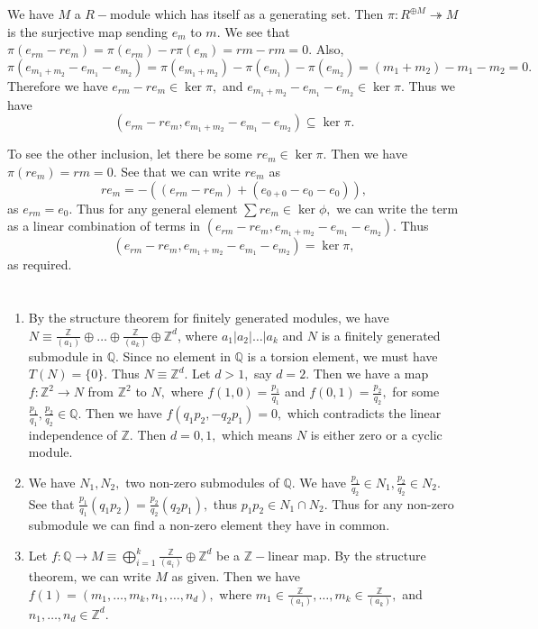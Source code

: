 \documentclass{article}
\begin{document}
\section{} %

\section{} %
We have $M$ a $R-$module which has itself as a generating set. Then $\pi: R^{\oplus M}\twoheadrightarrow M$ is the surjective map sending $e_m$ to $m.$ We 
see that $\pi(e_{rm}-re_m)=\pi(e_{rm})-r\pi(e_m)=rm-rm=0.$ Also, $\pi(e_{m_1+m_2}-e_{m_1}-e_{m_2})=\pi(e_{m_1+m_2})-\pi(e_{m_1})-\pi(e_{m_2})= 
(m_1+m_2)-m_1-m_2=0.$ Therefore we have $ e_{rm}-re_m \in \ker \pi, $ and $e_{m_1+m_2}-e_{m_1}-e_{m_2} \in \ker \pi.$ Thus we have 
$$(e_{rm}-re_m,e_{m_1+m_2}-e_{m_1}-e_{m_2}) \subseteq \ker \pi.$$ 

To see the other inclusion, let there be some $re_m \in \ker \pi.$ Then we have $\pi(re_m)=rm=0.$ See that we can write $re_m$ as $$re_m=-( 
(e_{rm}-re_m)+(e_{0+0}-e_0-e_0) ),$$ as $e_{rm}=e_0.$ Thus for any general element $\sum re_m \in \ker \phi ,$ we can write the term as a linear combination 
of terms in $\left(e_{rm}-re_m, e_{m_1+m_2}-e_{m_1}-e_{m_2}\right).$ Thus $$(e_{rm}-re_m,e_{m_1+m_2}-e_{m_1}-e_{m_2})= \ker \pi, $$ as required. 
\section{} %
\begin{enumerate}
	\item By the structure theorem for finitely generated modules, we have $N \equiv \frac{\mathbb{Z}}{(a_1)}\oplus \dots \oplus 
	\frac{\mathbb{Z}}{(a_k)}\oplus \mathbb{Z}^d$, where $a_1|a_2|\dots|a_k$ and $N$ is a finitely generated submodule in $\mathbb{Q}.$ Since no element in 
	$\mathbb{Q}$ is a torsion element, we must have $T(N)=\{0\}.$ Thus $N \equiv \mathbb{Z}^d.$ Let $d >1,$ say $d=2.$ Then we have a map $f: \mathbb{Z}^2 
	\rightarrow N$ from $\mathbb{Z}^2$ to $N,$ where $f(1,0)=\frac{p_1}{q_1}$ and $f(0,1)=\frac{p_2}{q_2},$ for some $\frac{p_1}{q_1},\frac{p_2}{q_2} \in 
	\mathbb{Q}.$ Then we have $ f(q_1p_2,-q_2p_1)=0, $ which contradicts the linear independence of $\mathbb{Z}.$ Then $d=0,1,$ which means $N$ is either 
	zero or a cyclic module.
	
	\item We have $N_1,N_2,$ two non-zero submodules of $\mathbb{Q}.$ We have $\frac{p_1}{q_2} \in N_1, \frac{p_2}{q_2} \in N_2.$ See that $ 
	\frac{p_1}{q_1}(q_1p_2)=\frac{p_2}{q_2}(q_2p_1),$ thus $p_1p_2 \in N_1 \cap N_2.$ Thus for any non-zero submodule we can find a non-zero element they 
	have in common. 
	
	\item Let $f: \mathbb{Q} \rightarrow M \equiv \bigoplus_{i=1}^k \frac{\mathbb{Z}}{(a_i)} \oplus \mathbb{Z}^d$ be a $\mathbb{Z}-$linear map. By the 
	structure theorem, we can write $M$ as given. Then we have $f(1)=(m_1,\dots,m_k,n_1,\dots,n_d),$ where $m_1 \in \frac{\mathbb{Z}}{(a_1)}, \dots, m_k \in 
	\frac{\mathbb{Z}}{(a_k)},$ and $n_1,\dots,n_d \in \mathbb{Z}^d.$ 
	
\end{enumerate}
\end{document}

